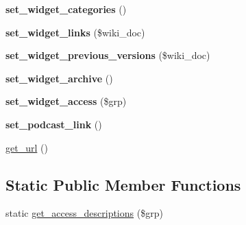 \begin{DoxyCompactItemize}
\item 
\hypertarget{classlms__wiki_a65d726fa68adc3322af0c9c45ab7eaac}{
{\bfseries set\_\-widget\_\-categories} ()}
\label{classlms__wiki_a65d726fa68adc3322af0c9c45ab7eaac}

\item 
\hypertarget{classlms__wiki_a831544ed2218444dadafbf04fb29183e}{
{\bfseries set\_\-widget\_\-links} (\$wiki\_\-doc)}
\label{classlms__wiki_a831544ed2218444dadafbf04fb29183e}

\item 
\hypertarget{classlms__wiki_ae9ea58c546b63f8d1058c393c2bfe92c}{
{\bfseries set\_\-widget\_\-previous\_\-versions} (\$wiki\_\-doc)}
\label{classlms__wiki_ae9ea58c546b63f8d1058c393c2bfe92c}

\item 
\hypertarget{classlms__wiki_a0b5e7575454ee0217d5311af0f42fd07}{
{\bfseries set\_\-widget\_\-archive} ()}
\label{classlms__wiki_a0b5e7575454ee0217d5311af0f42fd07}

\item 
\hypertarget{classlms__wiki_a1aef9d04e0e9b7ea996d869358600c14}{
{\bfseries set\_\-widget\_\-access} (\$grp)}
\label{classlms__wiki_a1aef9d04e0e9b7ea996d869358600c14}

\item 
\hypertarget{classlms__wiki_a948d9deb1366edd318b4a29d3fd68534}{
{\bfseries set\_\-podcast\_\-link} ()}
\label{classlms__wiki_a948d9deb1366edd318b4a29d3fd68534}

\item 
\hyperlink{classlms__wiki_a4010e40e4de14385964a7e700d9c2411}{get\_\-url} ()
\end{DoxyCompactItemize}
\subsection*{Static Public Member Functions}
\begin{DoxyCompactItemize}
\item 
static \hyperlink{classlms__wiki_a586e481116ffe5502301ffd801411f26}{get\_\-access\_\-descriptions} (\$grp)
\end{DoxyCompactItemize}


